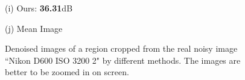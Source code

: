 \documentclass[10pt,onecolumn,letterpaper]{article}
\begin{document}
\begin{figure}[H]
{\begin{minipage}[t]{0.195\textwidth}
{\footnotesize (i) Ours: \textbf{36.31}dB}
\end{minipage}
\begin{minipage}[t]{0.195\textwidth}
\centering
{}
{\footnotesize (j) Mean Image \cite{crosschannel2016}}
\end{minipage}
}
\caption{Denoised images of a region cropped from the real noisy image ``Nikon D600 ISO 3200 2" \cite{crosschannel2016} by different methods. The images are better to be zoomed in on screen.}
\label{fig6}
\end{figure}
\end{document}
